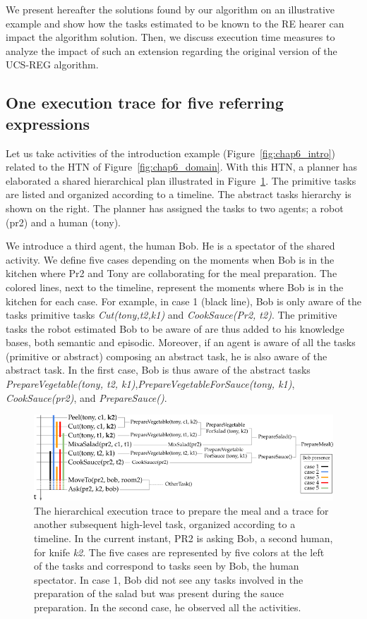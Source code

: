 We present hereafter the solutions found by our algorithm on an illustrative example and show how the tasks estimated to be known to the RE hearer can impact the algorithm solution. Then, we discuss execution time measures to analyze the impact of such an extension regarding the original version of the UCS-REG algorithm.

\subsection{One execution trace for five referring expressions}

Let us take activities of the introduction example (Figure~\ref{fig:chap6_intro}) related to the HTN of Figure~\ref{fig:chap6_domain}. With this HTN, a planner has elaborated a shared hierarchical plan illustrated in Figure~\ref{fig:chap6_meal_plan}. The primitive tasks are listed and organized according to a timeline. The abstract tasks hierarchy is shown on the right. The planner has assigned the tasks to two agents; a robot (pr2) and a human (tony).

We introduce a third agent, the human Bob. He is a spectator of the shared activity. We define five cases depending on the moments when Bob is in the kitchen where Pr2 and Tony are collaborating for the meal preparation. The colored lines, next to the timeline, represent the moments where Bob is in the kitchen for each case. For example, in case 1 (black line), Bob is only aware of the tasks primitive tasks \textit{Cut(tony,t2,k1)} and \textit{CookSauce(Pr2, t2)}. The primitive tasks the robot estimated Bob to be aware of are thus added to his knowledge bases, both semantic and episodic. Moreover, if an agent is aware of all the tasks (primitive or abstract) composing an abstract task, he is also aware of the abstract task. In the first case, Bob is thus aware of the abstract tasks \textit{PrepareVegetable(tony, t2, k1)},\textit{PrepareVegetableForSauce(tony, k1)}, \textit{CookSauce(pr2)}, and \textit{PrepareSauce()}.

\begin{figure}[ht!]
\centering
\includegraphics[width=\textwidth]{figures/chapter6/prepare_meal_plan.png}
\caption{\label{fig:chap6_meal_plan} The hierarchical execution trace to prepare the meal and a trace for another subsequent high-level task, organized according to a timeline. In the current instant, PR2 is asking Bob, a second human, for knife \textit{k2}. The five cases are represented by five colors at the left of the tasks and correspond to tasks seen by Bob, the human spectator. In case 1, Bob did not see any tasks involved in the preparation of the salad but was present during the sauce preparation. In the second case, he observed all the activities.}
\end{figure}

